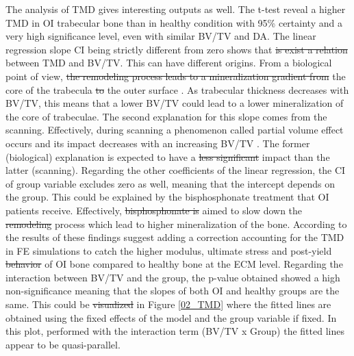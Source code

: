 \documentclass[a4paper,fleqn]{DC_ArtStyle}
\providecommand{\DIFadd}[1]{{\protect\color{blue}{#1}}} %
\providecommand{\DIFdel}[1]{{\protect\color{red}\sout{#1}}}                      %
\providecommand{\DIFaddbegin}{} %
\providecommand{\DIFaddend}{} %
\providecommand{\DIFdelbegin}{} %
\providecommand{\DIFdelend}{} %
\begin{document}
\DIFdelend The analysis of TMD gives interesting outputs as well. The t-test reveal a higher TMD in OI trabecular bone than in healthy condition with 95\% certainty and a very high significance level, even with similar BV/TV and DA. The linear regression slope CI being strictly different from zero shows that \DIFdelbegin \DIFdel{is exist a relation }\DIFdelend \DIFaddbegin \DIFadd{a relation exists }\DIFaddend between TMD and BV/TV. This can have different origins. From a biological point of view, \DIFdelbegin \DIFdel{the remodeling process leads to a mineralization gradient from }\DIFdelend \DIFaddbegin \DIFadd{a mineralisation gradient develops between }\DIFaddend the core of the trabecula \DIFdelbegin \DIFdel{to }\DIFdelend \DIFaddbegin \DIFadd{undergoing secondary mineralisation and }\DIFaddend the outer surface \DIFaddbegin \DIFadd{subjected to remodelling and deposition of younger, less mineralised matrix}\DIFaddend . As trabecular thickness decreases with BV/TV, this means that a lower BV/TV could lead to a lower mineralization of the core of \DIFaddbegin \DIFadd{the }\DIFaddend trabeculae. The second explanation for this slope comes from the scanning. Effectively, during scanning a phenomenon called partial volume effect occurs and its impact decreases with an increasing BV/TV \DIFaddbegin \DIFadd{as the ratio of bone surface to bone volume BS/BV decreases}\DIFaddend . The former (biological) explanation is expected to have a \DIFdelbegin \DIFdel{less significant }\DIFdelend \DIFaddbegin \DIFadd{lower }\DIFaddend impact than the latter (scanning). Regarding the other coefficients of the linear regression, the CI of group variable excludes zero as well, meaning that the intercept depends on the group. This could be explained by the bisphosphonate treatment that OI patients receive. Effectively, \DIFdelbegin \DIFdel{bisphosphonate is }\DIFdelend \DIFaddbegin \DIFadd{bisphosphonates are }\DIFaddend aimed to slow down the \DIFdelbegin \DIFdel{remodeling }\DIFdelend \DIFaddbegin \DIFadd{remodelling }\DIFaddend process which lead to higher \DIFaddbegin \DIFadd{(secondary) }\DIFaddend mineralization of the bone. According to the results of \citeauthor{Indermaur2021}\cite{Indermaur2021} these findings suggest adding a correction accounting for the TMD in FE simulations to catch the higher modulus, ultimate stress and post-yield \DIFdelbegin \DIFdel{behavior }\DIFdelend \DIFaddbegin \DIFadd{behaviour }\DIFaddend of OI bone compared to healthy bone at the ECM level. Regarding the interaction between BV/TV and the group, the p-value obtained showed a high non-significance meaning that the slopes of both OI and healthy groups are the same. This could be \DIFdelbegin \DIFdel{visualized }\DIFdelend \DIFaddbegin \DIFadd{visualised }\DIFaddend in Figure \ref{02_TMD} where the fitted lines are obtained using the fixed effects of the model and the group variable if fixed. In this plot, performed with the interaction term (BV/TV x Group) the fitted lines appear to be quasi-parallel. \DIFdelbegin %
\end{document}
